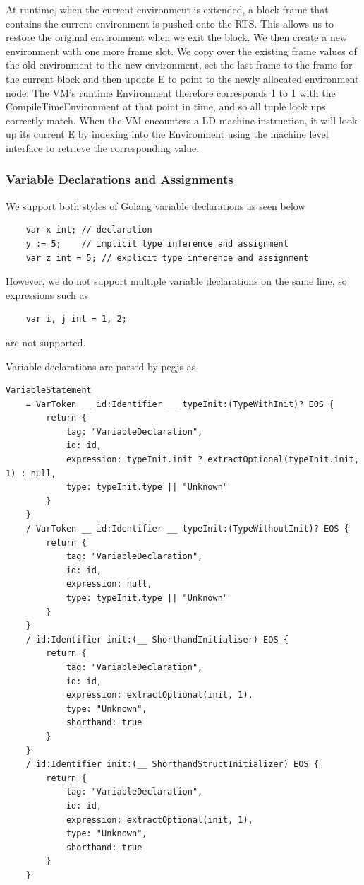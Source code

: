 \documentclass{report}
\begin{document}
At runtime, when the current environment is extended, a block frame that contains the current environment is pushed onto the RTS. This allows us to restore the original environment when we exit the block. We then create a new environment with one more frame slot. We copy over the existing frame values of the old environment to the new environment, set the last frame to the frame for the current block and then update E to point to the newly allocated environment node. The VM's runtime Environment therefore corresponds 1 to 1 with the CompileTimeEnvironment at that point in time, and so all tuple look ups correctly match. When the VM encounters a LD machine instruction, it will look up its current E by indexing into the Environment using the machine level interface to retrieve the corresponding value. 

\subsubsection{Variable Declarations and Assignments}

We support both styles of Golang variable declarations as seen below

\begin{verbatim}
    var x int; // declaration
    y := 5;    // implicit type inference and assignment
    var z int = 5; // explicit type inference and assignment
\end{verbatim}

However, we do not support multiple variable declarations on the same line, so expressions such as 

\begin{verbatim}
    var i, j int = 1, 2;
\end{verbatim}

are not supported.


Variable declarations are parsed by pegjs as 

\begin{verbatim}
VariableStatement
    = VarToken __ id:Identifier __ typeInit:(TypeWithInit)? EOS {
        return {
            tag: "VariableDeclaration",
            id: id,
            expression: typeInit.init ? extractOptional(typeInit.init, 1) : null,
            type: typeInit.type || "Unknown"
        }
    }
    / VarToken __ id:Identifier __ typeInit:(TypeWithoutInit)? EOS {
        return {
            tag: "VariableDeclaration",
            id: id,
            expression: null,
            type: typeInit.type || "Unknown"
        }
    }
    / id:Identifier init:(__ ShorthandInitialiser) EOS {
        return {
            tag: "VariableDeclaration",
            id: id,
            expression: extractOptional(init, 1),
            type: "Unknown",
            shorthand: true
        }
    }
    / id:Identifier init:(__ ShorthandStructInitializer) EOS {
        return {
            tag: "VariableDeclaration",
            id: id,
            expression: extractOptional(init, 1),
            type: "Unknown",
            shorthand: true
        }
    }
\end{verbatim}
\end{document}
